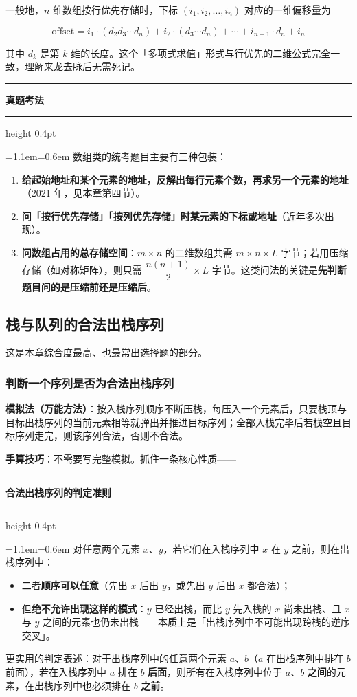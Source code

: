 \documentclass[11pt,openany,UTF8]{ctexbook}
\newcommand{\callouthead}[2]{%
  \par\addvspace{7pt}\noindent
  {\color{#1}\rule[-0.15em]{3pt}{1.05em}}\hspace{0.5em}%
  {\bfseries\color{#1}#2}\par\nobreak\vspace{-0.35em}%
  {\color{rulesep}\hrule height 0.4pt}\nobreak\vspace{0.45em}%
  \begingroup\small\setlength{\parindent}{0pt}%
  \leftskip=1.1em\rightskip=0.6em\noindent\ignorespaces}
\newcommand{\calloutend}{\par\endgroup\addvspace{7pt}}
\newenvironment{callkey}[1]{\callouthead{keybar}{#1}}{\calloutend}
\newenvironment{callexam}[1]{\callouthead{exambar}{#1}}{\calloutend}
\begin{document}
一般地，$n$ 维数组按行优先存储时，下标 $(i_1, i_2, \ldots, i_n)$ 对应的一维偏移量为

\[\text{offset} = i_1 \cdot (d_2 d_3 \cdots d_n) + i_2 \cdot (d_3 \cdots d_n) + \cdots + i_{n-1} \cdot d_n + i_n\]

其中 $d_k$ 是第 $k$ 维的长度。这个「多项式求值」形式与行优先的二维公式完全一致，理解来龙去脉后无需死记。

\begin{callexam}{真题考法}
数组类的统考题目主要有三种包装：

\begin{enumerate}
\item \textbf{给起始地址和某个元素的地址，反解出每行元素个数，再求另一个元素的地址}（2021 年，见本章第四节）。
\item \textbf{问「按行优先存储」「按列优先存储」时某元素的下标或地址}（近年多次出现）。
\item \textbf{问数组占用的总存储空间}：$m \times n$ 的二维数组共需 $m \times n \times L$ 字节；若用压缩存储（如对称矩阵），则只需 $\dfrac{n(n+1)}{2} \times L$ 字节。这类问法的关键是\textbf{先判断题目问的是压缩前还是压缩后}。
\end{enumerate}
\end{callexam}

\subsection{栈与队列的合法出栈序列}

这是本章综合度最高、也最常出选择题的部分。

\subsubsection{判断一个序列是否为合法出栈序列}

\textbf{模拟法（万能方法）}：按入栈序列顺序不断压栈，每压入一个元素后，只要栈顶与目标出栈序列的当前元素相等就弹出并推进目标序列；全部入栈完毕后若栈空且目标序列走完，则该序列合法，否则不合法。

\textbf{手算技巧}：不需要写完整模拟。抓住一条核心性质——

\begin{callkey}{合法出栈序列的判定准则}
对任意两个元素 $x$、$y$，若它们在入栈序列中 $x$ 在 $y$ 之前，则在出栈序列中：

\begin{itemize}
\item 二者\textbf{顺序可以任意}（先出 $x$ 后出 $y$，或先出 $y$ 后出 $x$ 都合法）；
\item 但\textbf{绝不允许出现这样的模式}：$y$ 已经出栈，而比 $y$ 先入栈的 $x$ 尚未出栈、且 $x$ 与 $y$ 之间的元素也仍未出栈——本质上是「出栈序列中不可能出现跨栈的逆序交叉」。
\end{itemize}
更实用的判定表述：对于出栈序列中的任意两个元素 $a$、$b$（$a$ 在出栈序列中排在 $b$ 前面），若在入栈序列中 $a$ 排在 $b$ \textbf{后面}，则所有在入栈序列中位于 $a$、$b$ \textbf{之间}的元素，在出栈序列中也必须排在 $b$ \textbf{之前}。

\end{callkey}
\end{document}
